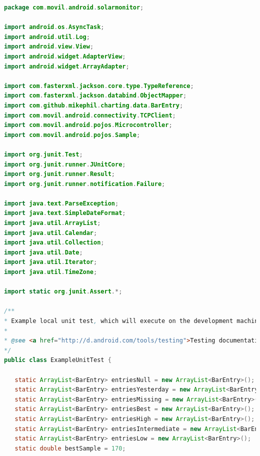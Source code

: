 \begin{lstlisting}[language= Java, frame=single]
package com.movil.android.solarmonitor;

import android.os.AsyncTask;
import android.util.Log;
import android.view.View;
import android.widget.AdapterView;
import android.widget.ArrayAdapter;

import com.fasterxml.jackson.core.type.TypeReference;
import com.fasterxml.jackson.databind.ObjectMapper;
import com.github.mikephil.charting.data.BarEntry;
import com.movil.android.connectivity.TCPClient;
import com.movil.android.pojos.Microcontroller;
import com.movil.android.pojos.Sample;

import org.junit.Test;
import org.junit.runner.JUnitCore;
import org.junit.runner.Result;
import org.junit.runner.notification.Failure;

import java.text.ParseException;
import java.text.SimpleDateFormat;
import java.util.ArrayList;
import java.util.Calendar;
import java.util.Collection;
import java.util.Date;
import java.util.Iterator;
import java.util.TimeZone;

import static org.junit.Assert.*;

/**
* Example local unit test, which will execute on the development machine (host).
*
* @see <a href="http://d.android.com/tools/testing">Testing documentation</a>
*/
public class ExampleUnitTest {

   static ArrayList<BarEntry> entriesNull = new ArrayList<BarEntry>();
   static ArrayList<BarEntry> entriesYesterday = new ArrayList<BarEntry>();
   static ArrayList<BarEntry> entriesMissing = new ArrayList<BarEntry>();
   static ArrayList<BarEntry> entriesBest = new ArrayList<BarEntry>();
   static ArrayList<BarEntry> entriesHigh = new ArrayList<BarEntry>();
   static ArrayList<BarEntry> entriesIntermediate = new ArrayList<BarEntry>();
   static ArrayList<BarEntry> entriesLow = new ArrayList<BarEntry>();
   static double bestSample = 170;


\end{lstlisting}

